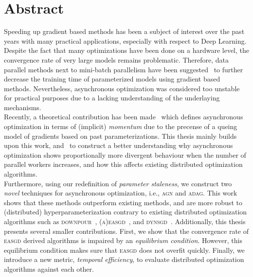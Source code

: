 %
%
%

\newpage
\chapter*{Abstract}

Speeding up gradient based methods has been a subject of interest over the past years with many practical applications, especially with respect to Deep Learning. Despite the fact that many optimizations have been done on a hardware level, the convergence rate of very large models remains problematic. Therefore, data parallel methods next to mini-batch parallelism have been suggested~\cite{dean2012large, ho2013more, hadjis2016omnivore, recht2011hogwild, louppe2010zealous, jiang2017heterogeneity, zhang2015deep} to further decrease the training time of parameterized models using gradient based methods. Nevertheless, asynchronous optimization was considered too unstable for practical purposes due to a lacking understanding of the underlaying mechanisms.\\

Recently, a theoretical contribution has been made~\cite{implicitmomentum} which defines asynchronous optimization in terms of (implicit) \emph{momentum} due to the precense of a queing model of gradients based on past parameterizations. This thesis mainly builds upon this work, and~\cite{zhang2015deep} to construct a better understanding why asynchronous optimization shows proportionally more divergent behaviour when the number of parallel workers increases, and how this affects existing distributed optimization algorithms.\\

Furthermore, using our redefinition of \emph{parameter staleness}, we construct two \emph{novel} techniques for asynchronous optimization, i.e., \textsc{agn} and \textsc{adag}. This work shows that these methods outperform existing methods, and are more robust to (distributed) hyperparameterization contrary to existing distributed optimization algorithms such as \textsc{downpour}~\cite{dean2012large}, \textsc{(a)easgd}~\cite{zhang2015deep}, and \textsc{dynsgd}~\cite{jiang2017heterogeneity}. Additionally, this thesis presents several smaller contributions. First, we show that the convergence rate of \textsc{easgd} derived algorithms is impaired by an \emph{equilibrium condition}. However, this equilibrium condition makes sure that \textsc{easgd} does not overfit quickly. Finally, we introduce a new metric, \emph{temporal efficiency}, to evaluate distributed optimization algorithms against each other.
